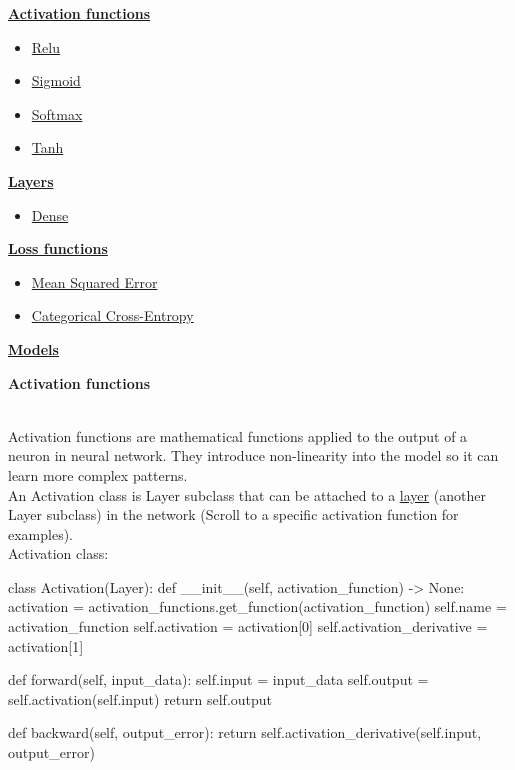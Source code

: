\documentclass{article}
\begin{document}
    \hyperlink{activation_functions}{\textbf{Activation functions}}
    \begin{itemize}
        \item \hyperlink{relu}{Relu}
        \item \hyperlink{sigmoid}{Sigmoid}
        \item \hyperlink{softmax}{Softmax}
        \item \hyperlink{tanh}{Tanh}
    \end{itemize}

    \hyperlink{layers}{\textbf{Layers}}
    \begin{itemize}
        \item \hyperlink{dense_layer}{Dense}
    \end{itemize}
    \hyperlink{losses}{\textbf{Loss functions}}
    \begin{itemize}
        \item \hyperlink{mse}{Mean Squared Error}
        \item \hyperlink{cce}{Categorical Cross-Entropy}
    \end{itemize}
    \hyperlink{models}{\textbf{Models}} \\
    \clearpage

    \hypertarget{activation_functions}{\textbf{Activation functions}} \\

    Activation functions are mathematical functions applied to
    the output of a neuron in neural network. They introduce non-linearity into 
    the model so it can learn more complex patterns. \\

    An Activation class is Layer subclass that can be attached to a \hyperlink{layers}{\underline{layer}} 
    (another Layer subclass) in the network (Scroll to a specific activation function for examples). \\

    Activation class:
    \begin{python}
class Activation(Layer):
    def __init__(self, activation_function) -> None:
        activation = activation_functions.get_function(activation_function)
        self.name = activation_function
        self.activation = activation[0]
        self.activation_derivative = activation[1]

    def forward(self, input_data):
        self.input = input_data
        self.output = self.activation(self.input)
        return self.output

    def backward(self, output_error):
        return self.activation_derivative(self.input, output_error)
    \end{python}
    \pagebreak
\end{document}
